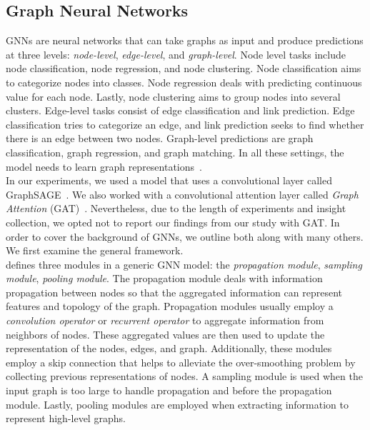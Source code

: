 \subsection{Graph Neural Networks}
\label{subsec:mixedApproaches_GraphNeuralNetworks}
GNNs are neural networks that can take graphs as input and produce predictions at three levels:
\emph{node-level}, \emph{edge-level}, and \emph{graph-level}. Node level tasks include node classification, node
regression, and node clustering. Node classification aims to categorize nodes into classes. Node regression deals with
predicting continuous value for each node. Lastly, node clustering aims to group nodes into several clusters. Edge-level tasks consist of edge classification and link prediction. Edge classification tries to categorize an edge, and link prediction seeks to find whether there is an edge between two nodes. Graph-level predictions are graph classification, graph regression, and graph matching. In all these settings, the model needs to learn graph representations~\parencite{GNNsAReview_Zhou}.\\
In our experiments, we used a model that uses a convolutional layer called GraphSAGE~\parencite{GraphSAGE_Hamilton}. We also worked with a convolutional attention layer called \emph{Graph Attention} (GAT)~\parencite{GraphAttentionNetworks_Velickovic}. Nevertheless, due to the length of experiments and insight collection, we opted not to report our findings from our study with GAT. In order to cover the background of GNNs, we outline both along with many others. We first examine the general framework.\\
\cite{GNNsAReview_Zhou} defines three modules in a generic GNN model: the \emph{propagation module}, \emph{sampling module}, \emph{pooling module}. The propagation module deals with information propagation between nodes so that the aggregated information can represent features and topology of the graph. Propagation modules usually employ a \emph{convolution operator} or \emph{recurrent operator} to aggregate information from neighbors of nodes. These aggregated values are then used to update the representation of the nodes, edges, and graph. Additionally, these modules employ a skip connection that helps to alleviate the over-smoothing problem by collecting previous representations of nodes. A sampling module is used when the input graph is too large to handle propagation and before the propagation module. Lastly, pooling modules are employed when extracting information to represent high-level graphs.\\
